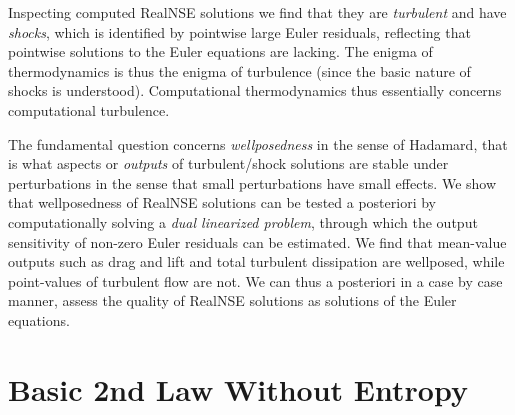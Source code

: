 Inspecting computed RealNSE solutions we find that they are 
\emph{turbulent} and have \emph{shocks}, which is identified by pointwise
large Euler residuals, reflecting that pointwise solutions
to the Euler equations are lacking. The enigma of thermodynamics
is thus the enigma of turbulence (since the basic nature of shocks is 
understood). Computational thermodynamics thus essentially
concerns computational turbulence.

 
The fundamental question concerns \emph{wellposedness} in the sense
of Hadamard, that is what aspects or \emph{outputs} of 
turbulent/shock solutions 
are stable under perturbations in the sense that small perturbations
have small effects. We show that wellposedness of RealNSE solutions
can be tested a posteriori by computationally solving a \emph{dual linearized
problem}, through which the output sensitivity of non-zero Euler residuals
can be estimated. We find that mean-value outputs such as drag and lift 
and total turbulent dissipation are wellposed, while point-values
of turbulent flow are not. We can thus a posteriori in a case by case 
manner, assess the quality of RealNSE solutions as solutions of the Euler 
equations. 
   
\section{Basic 2nd Law Without Entropy}

